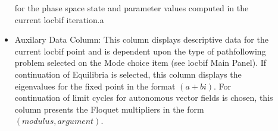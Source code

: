 \begin{description}
\begin{itemize}
	   for the phase space state and parameter values computed in the current locbif iteration.a
	   \item {Auxilary Data Column: } This column displays descriptive data for the current locbif
	   point and is dependent upon the type of pathfollowing problem selected on the Mode choice
	   item (see locbif Main Panel).  If continuation of Equilibria is selected, this column displays
	   the eigenvalues for the fixed point in the format $(a + b i)$.  For continuation of limit
	   cycles for autonomous vector fields is chosen, this column presents the Floquet multipliers
	   in the form $(modulus, argument)$.
        \end{itemize}
\end{description}


\clearpage




